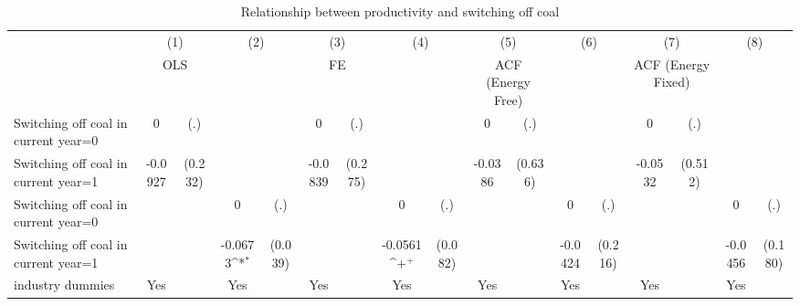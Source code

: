 \begin{table}[htbp]\centering
\def\sym#1{\ifmmode^{#1}\else\(^{#1}\)\fi}
\caption{Relationship between productivity and switching off coal}
\begin{tabular}{l*{8}{cc}}
\toprule
                    &\multicolumn{2}{c}{(1)}           &\multicolumn{2}{c}{(2)}           &\multicolumn{2}{c}{(3)}           &\multicolumn{2}{c}{(4)}           &\multicolumn{2}{c}{(5)}           &\multicolumn{2}{c}{(6)}           &\multicolumn{2}{c}{(7)}           &\multicolumn{2}{c}{(8)}           \\
                    &\multicolumn{2}{c}{OLS}           &\multicolumn{2}{c}{}              &\multicolumn{2}{c}{FE}            &\multicolumn{2}{c}{}              &\multicolumn{2}{c}{ACF (Energy Free)}&\multicolumn{2}{c}{}              &\multicolumn{2}{c}{ACF (Energy Fixed)}&\multicolumn{2}{c}{}              \\
\midrule
Switching off coal in current year=0&           0         &         (.)&                     &            &           0         &         (.)&                     &            &           0         &         (.)&                     &            &           0         &         (.)&                     &            \\
Switching off coal in current year=1&     -0.0927         &     (0.232)&                     &            &     -0.0839         &     (0.275)&                     &            &     -0.0386         &     (0.636)&                     &            &     -0.0532         &     (0.512)&                     &            \\
Switching off coal in current year=0&                     &            &           0         &         (.)&                     &            &           0         &         (.)&                     &            &           0         &         (.)&                     &            &           0         &         (.)\\
Switching off coal in current year=1&                     &            &     -0.0673\sym{*}  &     (0.039)&                     &            &     -0.0561\sym{+}  &     (0.082)&                     &            &     -0.0424         &     (0.216)&                     &            &     -0.0456         &     (0.180)\\
industry dummies    &         Yes         &            &         Yes         &            &         Yes         &            &         Yes         &            &         Yes         &            &         Yes         &            &         Yes         &            &         Yes         &            \\

\end{tabular}
\end{table}
